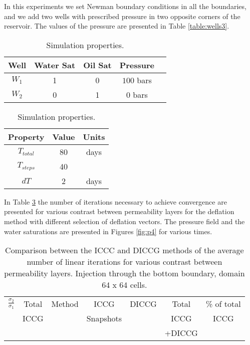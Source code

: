 \documentclass[12pt]{article}
\begin{document}
In this experiments we set Newman boundary conditions in all the boundaries, and we add two wells with prescribed pressure in two opposite corners of the reservoir. The values of the pressure are presented in Table \ref{table:wells3}.
\begin{table}[!ht]
\hspace{-0cm}
\begin{minipage}{.5\textwidth}
\centering
\begin{tabular}{ |c|c|c|c|c|} 
\hline
Well&Water Sat&Oil Sat&Pressure\\
\hline
$W_1$&     1&    0 & $100$ bars \\  
$W_2$& 0& 1& $0$ bars\\
\hline
\end{tabular}
\caption{Wells properties.}\label{table:wells4}
\end{minipage}%
\begin{minipage}{.4\textwidth}
\centering
\begin{tabular}{ |c|c|c|} 
\hline
Property&Value&Units\\
\hline
    $T_{total}$&     80& days\\
    $T_{steps}$& 40&\\
$dT$& 2&days\\
\hline
\end{tabular}\caption{Simulation properties.}
\label{table:icw}
\end{minipage}
\hspace{1cm} 
\end{table} 


In Table \ref{table:liter4} the number of iterations necessary to achieve convergence are presented for various contrast between permeability layers for the deflation method with different selection of deflation vectors. 
The pressure field and the water saturations are presented in Figures \ref{fig:p4} for various times.
\begin{table}[!h]\centering
\begin{minipage}{1\textwidth}
 \centering
\begin{tabular}{ ||c|c||l|c|c|c|c||} 
\hline
$\frac{\sigma_2}{\sigma_1}$&Total&Method  & ICCG&DICCG &Total&\% of total\\ 
                           & ICCG     &  & Snapshots& &ICCG& ICCG\\ 
                            &     &  & & &+DICCG& \\


\end{tabular} 
\caption{Comparison between the ICCC and DICCG methods of the average number of linear iterations for various contrast between permeability layers. Injection through the bottom boundary, domain 64 x 64 cells.}\label{table:liter4} 
\end{minipage}  
\end{table}  
\end{document}

